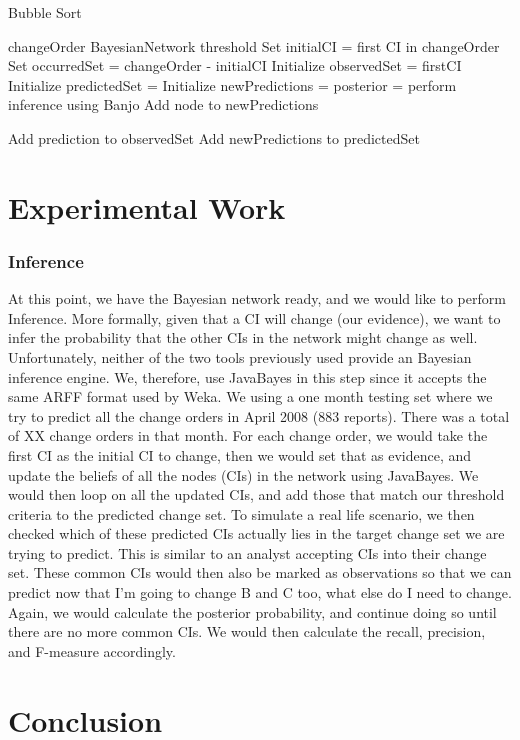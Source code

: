 \documentclass{article}
\begin{document}
\begin{algorithm}[tb]
   \caption{Bubble Sort}
   \label{alg:example}
\begin{algorithmic}
    changeOrder
     BayesianNetwork
     threshold
    \STATE Set initialCI = first CI in changeOrder
    \STATE Set occurredSet = changeOrder - initialCI
    \STATE Initialize observedSet = {firstCI}
    \STATE Initialize predictedSet = {}
   \REPEAT  
    \STATE Initialize newPredictions = {}
    \STATE posterior = perform inference using Banjo
      \STATE Add node to newPredictions   
    \ENDIF
    \ENDFOR

      \STATE Add prediction to observedSet
    \ENDIF
    \ENDFOR
\STATE Add newPredictions to predictedSet

\end{algorithmic}
\end{algorithm}


\section{Experimental Work}
\label{sec:exp}

\subsubsection*{Inference}

At this point, we have the Bayesian network ready, and we would like to perform Inference. More formally, given that a CI will change (our evidence), we want
to infer the probability that the other CIs in the network might change as well. Unfortunately, neither of the two tools previously used provide an Bayesian
inference engine. We, therefore, use JavaBayes in this step since it accepts the same ARFF format used by Weka. We using a one month testing set where we try
to predict all the change orders in April 2008 (883 reports). There was a total of XX change orders in that month. For each change order, we would take the
first CI as the initial CI to change, then we would set that as evidence, and update the beliefs of all the nodes (CIs) in the network using JavaBayes. We would
then loop on all the updated CIs, and add those that match our threshold criteria to the predicted change set. To simulate a real life scenario, we then checked
which of these predicted CIs actually lies in the target change set we are trying to predict. This is similar to an analyst accepting CIs into their change set.
These common CIs would then also be marked as observations so that we can predict now that I'm going to change B and C too, what else do I need to change.
Again, we would calculate the posterior probability, and continue doing so until there are no more common CIs. We would then calculate the recall, precision,
and F-measure accordingly.

\section{Conclusion}
\label{concl}




\end{document}
